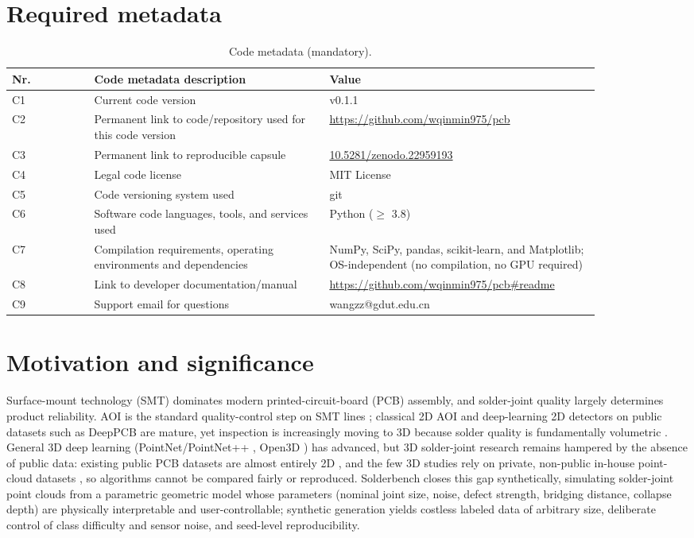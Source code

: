 \documentclass[3p]{elsarticle}
\begin{document}
\section{Required metadata}
\begin{table}[htbp]
\centering
\caption{Code metadata (mandatory).}
\begin{tabular}{lp{0.40\linewidth}p{0.46\linewidth}}
\toprule
\textbf{Nr.} & \textbf{Code metadata description} & \textbf{Value} \\
\midrule
C1 & Current code version & v0.1.1 \\
C2 & Permanent link to code/repository used for this code version & \url{https://github.com/wqinmin975/pcb} \\
C3 & Permanent link to reproducible capsule & \url{10.5281/zenodo.22959193} \\
C4 & Legal code license & MIT License \\
C5 & Code versioning system used & git \\
C6 & Software code languages, tools, and services used & Python ($\ge$ 3.8) \\
C7 & Compilation requirements, operating environments and dependencies & NumPy, SciPy, pandas, scikit-learn, and Matplotlib; OS-independent (no compilation, no GPU required) \\
C8 & Link to developer documentation/manual & \url{https://github.com/wqinmin975/pcb\#readme} \\
C9 & Support email for questions & wangzz@gdut.edu.cn \\
\bottomrule
\end{tabular}
\end{table}
\section{Motivation and significance}
Surface-mount technology (SMT) dominates modern printed-circuit-board (PCB) assembly, and solder-joint quality largely determines product reliability. AOI is the standard quality-control step on SMT lines \cite{ref1,ref2,ref3}; classical 2D AOI and deep-learning 2D detectors \cite{ref4} on public datasets such as DeepPCB \cite{ref5} are mature, yet inspection is increasingly moving to 3D because solder quality is fundamentally volumetric \cite{ref6,ref7}. General 3D deep learning (PointNet/PointNet++ \cite{ref8,ref9}, Open3D \cite{ref10}) has advanced, but 3D solder-joint research remains hampered by the absence of public data: existing public PCB datasets are almost entirely 2D \cite{ref5}, and the few 3D studies rely on private, non-public in-house point-cloud datasets \cite{ref6,ref7}, so algorithms cannot be compared fairly or reproduced. Solderbench closes this gap synthetically, simulating solder-joint point clouds from a parametric geometric model whose parameters (nominal joint size, noise, defect strength, bridging distance, collapse depth) are physically interpretable and user-controllable; synthetic generation yields costless labeled data of arbitrary size, deliberate control of class difficulty and sensor noise, and seed-level reproducibility.
\end{document}
